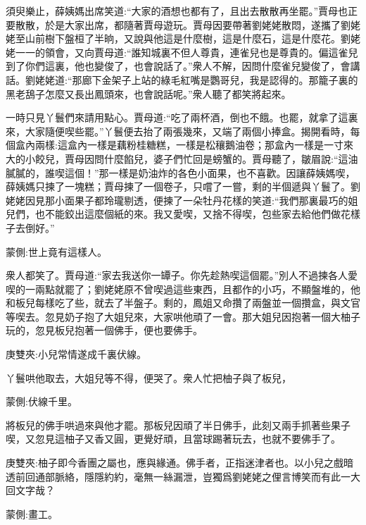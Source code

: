\begin{parag}
    須臾樂止，薛姨媽出席笑道:“大家的酒想也都有了，且出去散散再坐罷。”賈母也正要散散，於是大家出席，都隨著賈母遊玩。賈母因要帶著劉姥姥散悶，遂攜了劉姥姥至山前樹下盤桓了半晌，又說與他這是什麼樹，這是什麼石，這是什麼花。劉姥姥一一的領會，又向賈母道:“誰知城裏不但人尊貴，連雀兒也是尊貴的。偏這雀兒到了你們這裏，他也變俊了，也會說話了。”衆人不解，因問什麼雀兒變俊了，會講話。劉姥姥道:“那廊下金架子上站的綠毛紅嘴是鸚哥兒，我是認得的。那籠子裏的黑老鴰子怎麼又長出鳳頭來，也會說話呢。”衆人聽了都笑將起來。
\end{parag}


\begin{parag}
    一時只見丫鬟們來請用點心。賈母道:“吃了兩杯酒，倒也不餓。也罷，就拿了這裏來，大家隨便喫些罷。”丫鬟便去抬了兩張幾來，又端了兩個小捧盒。揭開看時，每個盒內兩樣:這盒內一樣是藕粉桂糖糕，一樣是松穰鵝油卷；那盒內一樣是一寸來大的小餃兒，賈母因問什麼餡兒，婆子們忙回是螃蟹的。賈母聽了，皺眉說:“這油膩膩的，誰喫這個！”那一樣是奶油炸的各色小面果，也不喜歡。因讓薛姨媽喫，薛姨媽只揀了一塊糕；賈母揀了一個卷子，只嚐了一嘗，剩的半個遞與丫鬟了。劉姥姥因見那小面果子都玲瓏剔透，便揀了一朵牡丹花樣的笑道:“我們那裏最巧的姐兒們，也不能鉸出這麼個紙的來。我又愛喫，又捨不得喫，包些家去給他們做花樣子去倒好。”\begin{note}蒙側:世上竟有這樣人。\end{note}衆人都笑了。賈母道:“家去我送你一罈子。你先趁熱喫這個罷。”別人不過揀各人愛喫的一兩點就罷了；劉姥姥原不曾喫過這些東西，且都作的小巧，不顯盤堆的，他和板兒每樣吃了些，就去了半盤子。剩的，鳳姐又命攢了兩盤並一個攢盒，與文官等喫去。忽見奶子抱了大姐兒來，大家哄他頑了一會。那大姐兒因抱著一個大柚子玩的，忽見板兒抱著一個佛手，便也要佛手。\begin{note}庚雙夾:小兒常情遂成千裏伏線。\end{note}丫鬟哄他取去，大姐兒等不得，便哭了。衆人忙把柚子與了板兒，\begin{note}蒙側:伏線千里。\end{note}將板兒的佛手哄過來與他才罷。那板兒因頑了半日佛手，此刻又兩手抓著些果子喫，又忽見這柚子又香又圓，更覺好頑，且當球踢著玩去，也就不要佛手了。\begin{note}庚雙夾:柚子即今香團之屬也，應與緣通。佛手者，正指迷津者也。以小兒之戲暗透前回通部脈絡，隱隱約約，毫無一絲漏泄，豈獨爲劉姥姥之俚言博笑而有此一大回文字哉？\end{note}\begin{note}蒙側:畫工。\end{note}
\end{parag}


